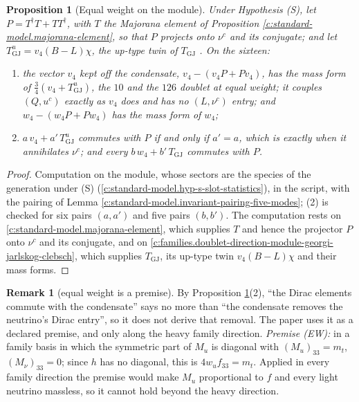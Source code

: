 \documentclass[11pt]{article}
\newtheorem{proposition}[theorem]{Proposition}
\theoremstyle{definition}
\newtheorem{remark}[theorem]{Remark}
\theoremstyle{plain}
\newcommand{\changedmark}[2]{\marginpar{\raggedright\scriptsize\color{#1}#2}}
\begin{document}
\begin{proposition}[Equal weight on the module]\label{c:standard-model.equal-weight-module}
\changedmark{gray}{reworded}
Under Hypothesis (S), let $P = T^{\dagger}T + TT^{\dagger}$, with $T$ the Majorana element of Proposition \ref{c:standard-model.majorana-element}, so that $P$ projects onto $\nu^{c}$ and its conjugate; and let $T^{u}_{\mathrm{GJ}} = v_{4}(B - L)\chi$, the up-type twin of $T_{\mathrm{GJ}}$ \cite[Prop.~8.1(iv)]{ButlerT13}. On the sixteen:
\begin{enumerate}
\item[(1)] the vector $v_{4}$ kept off the condensate, $v_{4} - (v_{4}P + Pv_{4})$, has the mass form of $\tfrac34(v_{4} + T^{u}_{\mathrm{GJ}})$, the $10$ and the $126$ doublet at equal weight; it couples $(Q, u^{c})$ exactly as $v_{4}$ does and has no $(L, \nu^{c})$ entry; and $w_{4} - (w_{4}P + Pw_{4})$ has the mass form of $w_{4}$;
\item[(2)] $a\,v_{4} + a'\,T^{u}_{\mathrm{GJ}}$ commutes with $P$ if and only if $a' = a$, which is exactly when it annihilates $\nu^{c}$; and every $b\,w_{4} + b'\,T_{\mathrm{GJ}}$ commutes with $P$.
\end{enumerate}
\end{proposition}
\begin{proof}
Computation on the module, whose sectors are the species of the generation under (S) (\ref{c:standard-model.hyp-s-slot-statistics}), in the script, with the pairing of Lemma \ref{c:standard-model.invariant-pairing-five-modes}; (2) is checked for six pairs $(a, a')$ and five pairs $(b, b')$. The computation rests on \ref{c:standard-model.majorana-element}, which supplies $T$ and hence the projector $P$ onto $\nu^{c}$ and its conjugate, and on \ref{c:families.doublet-direction-module-georgi-jarlskog-clebsch}, which supplies $T_{\mathrm{GJ}}$, its up-type twin $v_{4}(B - L)\chi$ and their mass forms.

\end{proof}

\begin{remark}[equal weight is a premise]\label{c:note.standard-model.equal-weight-premise}
By Proposition \ref{c:standard-model.equal-weight-module}(2), ``the Dirac elements commute with the condensate'' says no more than ``the condensate removes the neutrino's Dirac entry'', so it does not derive that removal. The paper uses it as a declared premise, and only along the heavy family direction. \emph{Premise (EW):} in a family basis in which the symmetric part of $M_{u}$ is diagonal with $(M_{u})_{33} = m_{t}$, $(M_{\nu})_{33} = 0$; since $h$ has no diagonal, this is $4w_{u}f_{33} = m_{t}$. Applied in every family direction the premise would make $M_{u}$ proportional to $f$ and every light neutrino massless, so it cannot hold beyond the heavy direction.
\end{remark}
\end{document}
